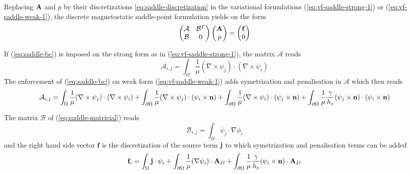 Replacing $\mathbf{A}$ and $p$ by their discretizations \ref{eq:saddle-discretization}
in the variational formulations (\ref{eq:vf-saddle-strong-1}) or
(\ref{eq:vf-saddle-weak-1}), the discrete magnetostatic saddle-point formulation
yields on the form
\begin{equation}
  \label{eq:saddle-matricial}
  \begin{pmatrix}
    \mathcal{A} & \mathcal{B}^{T} \\
    \mathcal{B} & 0 \\
  \end{pmatrix}
  \begin{pmatrix}
    \mathbf{A} \\
    p \\
  \end{pmatrix}
  =
  \begin{pmatrix}
    \mathbf{f} \\
    0 \\
  \end{pmatrix}
\end{equation}

If (\ref{eq:saddle-bc}) is imposed on the strong form as in
(\ref{eq:vf-saddle-strong-1}), the matrix $\mathcal{A}$ reads
\begin{equation}
  \label{eq:saddle-A-strong}
  \mathcal{A}_{i,j} = \int_{\Omega} \frac{1}{\mu}
  (\nabla \times \psi_j) \cdot (\nabla \times \psi_i)
\end{equation}
The enforcement of (\ref{eq:saddle-bc}) on weak form
(\ref{eq:vf-saddle-weak-1}) adds symetrization and penalisation in
$\mathcal{A}$ which then reads
\begin{equation}
  \label{eq:saddle-A-weak}
  \mathcal{A}_{i,j} = \int_{\Omega} \frac{1}{\mu} (\nabla \times \psi_j)
  \cdot (\nabla \times \psi_i)
  + \int_{\partial \Omega} \frac{1}{\mu} (\nabla \times \psi_j)
  \cdot (\psi_i \times \mathbf{n})
  + \int_{\partial \Omega} \frac{1}{\mu} (\nabla \times \psi_i)
  \cdot (\psi_j \times \mathbf{n})
  + \int_{\partial \Omega} \frac{1}{\mu} \frac{\gamma}{h_s} (\psi_j \times \mathbf{n})
  \cdot (\psi_i \times \mathbf{n})
\end{equation}

The matrix $\mathcal{B}$ of (\ref{eq:saddle-matricial}) reads
\begin{equation}
  \label{eq:saddle-point-B}
  \mathcal{B}_{i,j} = \int_{\Omega} \psi_j \cdot \nabla \phi_i
\end{equation}
and the right hand side vector $\mathbf{f}$ is the discretization of the source
term $\mathbf{j}$ to which symetrization and penalisation terms can be added
\begin{equation}
  \mathbf{f}_i = \displaystyle{ \int_{\Omega} \mathbf{j}\cdot \psi_i }
  + \int_{\partial \Omega} \frac{1}{\mu} (\nabla \psi_i) \cdot \mathbf{A}_D
  + \int_{\partial \Omega} \frac{1}{\mu}
  \frac{\gamma}{h_s} (\psi_i \times \mathbf{n}) \cdot \mathbf{A}_D
\end{equation}

